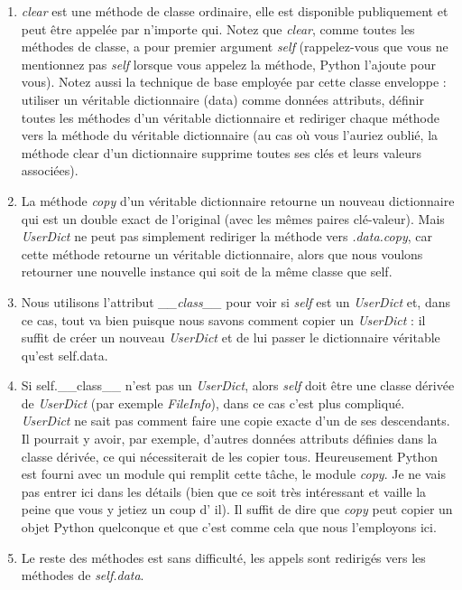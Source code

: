 \begin{enumerate}
\item{\emph{clear} est une méthode de classe ordinaire, elle est disponible publiquement et peut être appelée par n'importe qui. Notez que \emph{clear}, comme toutes les méthodes de classe, a pour premier argument \emph{self} (rappelez-vous que vous ne mentionnez pas \emph{self} lorsque vous appelez la méthode, Python l'ajoute pour  vous). Notez aussi la technique de base employée par cette classe enveloppe : utiliser un véritable dictionnaire (data) comme données attributs, définir toutes les méthodes d'un véritable dictionnaire et rediriger chaque méthode vers la méthode du véritable dictionnaire (au cas où vous l'auriez oublié, la méthode clear d'un dictionnaire supprime toutes ses clés et leurs valeurs associées).}
\item{La méthode \emph{copy} d'un véritable dictionnaire retourne un nouveau dictionnaire qui est un double exact de l'original (avec les mêmes paires clé-valeur). Mais \emph{UserDict} ne peut pas simplement rediriger la méthode vers \emph{.data.copy}, car cette méthode retourne un véritable dictionnaire, alors  que nous voulons retourner une nouvelle instance qui soit de la même classe que self.}
\item{Nous utilisons l'attribut \emph{\_\_class\_\_} pour voir si \emph{self} est un \emph{UserDict} et, dans ce cas, tout va bien puisque nous savons comment copier un \emph{UserDict} : il suffit de créer un nouveau \emph{UserDict} et de lui passer le dictionnaire véritable qu'est self.data.}
\item{Si self.\_\_class\_\_ n'est pas un \emph{UserDict}, alors \emph{self} doit être une classe dérivée de \emph{UserDict} (par exemple \emph{FileInfo}), dans ce cas c'est plus compliqué. \emph{UserDict} ne sait pas comment faire une copie exacte d'un de ses descendants. Il pourrait y avoir, par exemple, d'autres données attributs définies dans la classe dérivée, ce qui nécessiterait de les copier tous. Heureusement Python est fourni avec un module qui remplit cette tâche, le module \emph{copy}. Je ne vais pas entrer ici dans les détails (bien que ce soit très intéressant et vaille la peine que vous y jetiez un coup d' il). Il suffit de dire que \emph{copy} peut copier un objet Python quelconque et que c'est comme cela que nous l'employons ici.}
\item{Le reste des méthodes est sans difficulté, les appels sont redirigés vers les méthodes de \emph{self.data}.}
\end{enumerate}


